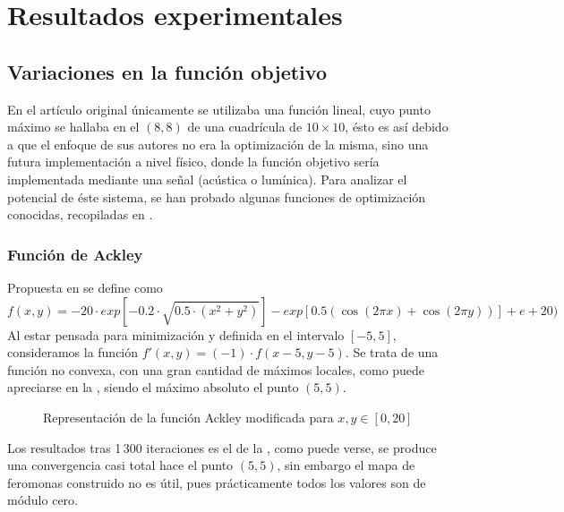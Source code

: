 \section{Resultados experimentales}




\subsection{Variaciones en la función objetivo}
En el artículo original \cite{initialPaper} únicamente se utilizaba una función lineal, cuyo punto máximo se hallaba en el $(8,8)$ de una cuadrícula de $10\times10$, ésto es así debido a que el enfoque de sus autores no era la optimización de la misma, sino una futura implementación a nivel físico, donde la función objetivo sería implementada mediante una señal (acústica o lumínica). Para analizar el potencial de éste sistema, se han probado algunas funciones de optimización conocidas, recopiladas en \cite{WebFuncionesOptimizacion}.

\subsubsection{Función de Ackley} Propuesta en \cite{AckleyFunction} se define como
\[ f(x,y)=-20 \cdot exp[-0.2 \cdot \sqrt{0.5 \cdot (x^2 + y^2)}] - exp[0.5 ( \cos(2 \pi x)
+ \cos(2 \pi y))] + e + 20)\]
Al estar pensada para minimización y definida en el intervalo $[-5,5]$, consideramos la función $f'(x,y)=(-1)\cdot f(x-5, y-5)$. Se trata de una función no convexa, con una gran cantidad de máximos locales, como puede apreciarse en la , siendo el máximo absoluto el punto $(5,5)$.

\begin{figure}[htbp]
    \centering
    \caption{Representación de la función Ackley modificada para $x,y\in[0,20]$}
\end{figure}

Los resultados tras 1\,300 iteraciones es el de la , como puede verse, se produce una convergencia casi total hace el punto $(5,5)$, sin embargo el mapa de feromonas construido no es útil, pues prácticamente todos los valores son de módulo cero.

